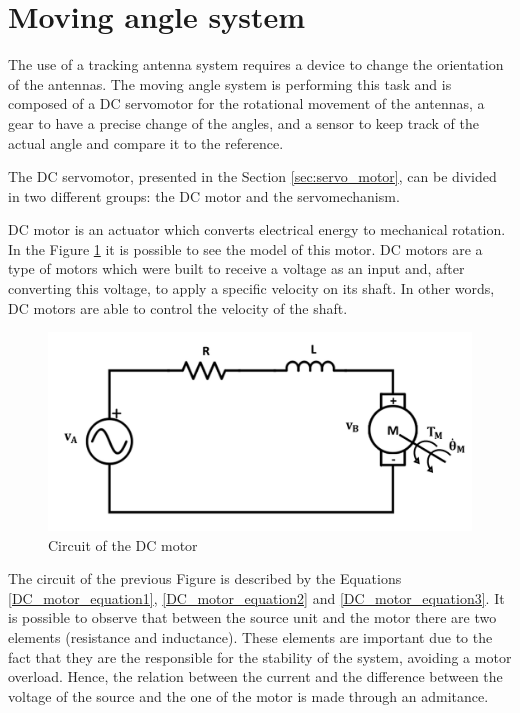 
\section{Moving angle system}\label{sec:servo_model}


The use of a tracking antenna system requires a device to change the orientation of the antennas. The moving angle system is performing this task and is composed of a DC servomotor for the rotational movement of the antennas, a gear to have a precise change of the angles, and a sensor to keep track of the actual angle and compare it to the reference.

The DC servomotor, presented in the Section \ref{sec:servo_motor}, can be divided in two different groups: the DC motor and the servomechanism.

DC motor is an actuator which converts electrical energy to mechanical rotation. In the Figure \ref{dcmotor_circuit} it is possible to see the model of this motor. DC motors are a type of motors which were built to receive a voltage as an input and, after converting this voltage, to apply a specific velocity on its shaft. In other words, DC motors are able to control the velocity of the shaft.

\begin{figure}[H]
\centering
\includegraphics[scale=0.5]{figures/dcmotor_circuit.png}
\caption{Circuit of the DC motor}
\label{dcmotor_circuit}
\end{figure}

The circuit of the previous Figure is described by the Equations \ref{DC_motor_equation1}, \ref{DC_motor_equation2} and \ref{DC_motor_equation3}. It is possible to observe that between the source unit and the motor there are two elements (resistance and inductance). These elements are important due to the fact that they are the responsible for the stability of the system, avoiding a motor overload. Hence, the relation between the current and the difference between the voltage of the source and the one of the motor is made through an admitance.

